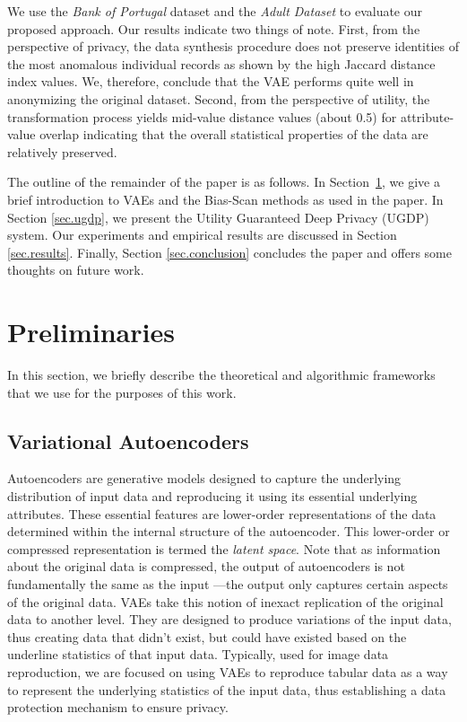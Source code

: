 \documentclass[dvipdft]{article}
\begin{document}
We use the \emph{Bank of Portugal} dataset \cite{ Moro2014} and the \emph{Adult Dataset} \cite{USAdult} to evaluate our proposed approach. 
Our results indicate two things of note.  First, from the perspective of privacy, the data synthesis procedure does not preserve identities of the most anomalous individual records as shown by the high Jaccard distance index values. We, therefore, conclude %
that the VAE performs quite well in anonymizing the original dataset. Second, from the perspective of utility, the transformation process yields mid-value distance values (about 0.5) for attribute-value overlap indicating that the overall statistical properties of the data are relatively preserved.  

The outline of the remainder of the paper is as follows. In Section~\ref{sec.tools}, we give a brief introduction to VAEs and the Bias-Scan methods as used in the paper. In Section \ref{sec.ugdp}, we present the Utility Guaranteed Deep Privacy (UGDP) system.  Our experiments and empirical results are discussed in Section \ref{sec.results}. Finally, Section \ref{sec.conclusion} concludes the paper and offers some thoughts on future work.  

\section{Preliminaries}
\label{sec.tools}
In this section, we briefly describe the theoretical and algorithmic frameworks that we use for the purposes of this work.

\subsection{Variational Autoencoders}

Autoencoders are generative models designed to capture the underlying distribution of input data and reproducing it using its essential underlying attributes. These essential features are lower-order representations of the data determined within the internal structure of the autoencoder. This lower-order or compressed representation is termed the \textit{latent space}. Note that as information about the original data is compressed, the output of autoencoders is not fundamentally the same as the input ---the output only captures certain aspects of the original data. 
VAEs take this notion of inexact replication of the original data to another level. They are designed to produce variations of the input data, thus creating data that didn't exist, but could have existed based on the underline statistics of that input data. Typically, used for image data reproduction, we are focused on using VAEs to reproduce tabular data as a way to represent the underlying statistics of the input data, thus establishing a data protection mechanism to ensure privacy. 
\end{document}
